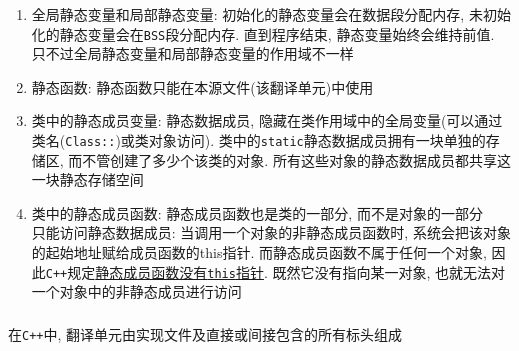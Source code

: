 \documentclass[10pt,twoside]{ctexart}
\begin{document}
\subsubsection[ISOK:{\tt static}关键字]{}
\begin{enumerate}
	\item 全局静态变量和局部静态变量: 初始化的静态变量会在数据段分配内存, 未初始化的静态变量会在{\tt BSS}段分配内存. 
			直到程序结束, 静态变量始终会维持前值. 只不过全局静态变量和局部静态变量的作用域不一样
	\item 静态函数: 静态函数只能在本源文件(该翻译单元)中使用
	\item 类中的静态成员变量: 静态数据成员, 隐藏在类作用域中的全局变量(可以通过类名({\tt Class::})或类对象访问). 
			类中的{\tt static}静态数据成员拥有一块单独的存储区, 而不管创建了多少个该类的对象. 
			所有这些对象的静态数据成员都共享这一块静态存储空间
	\item 类中的静态成员函数: 静态成员函数也是类的一部分, 而不是对象的一部分
		\\  只能访问静态数据成员: 
			当调用一个对象的非静态成员函数时, 系统会把该对象的起始地址赋给成员函数的this指针. 
			而静态成员函数不属于任何一个对象, 因此{\tt C++}规定\uline{静态成员函数没有{\tt this}指针}. 
			既然它没有指向某一对象, 也就无法对一个对象中的非静态成员进行访问
\end{enumerate}

\subsubsection[ISOK:{\tt extern}关键字与链接性]{}

在{\tt C++}中, 翻译单元由实现文件及直接或间接包含的所有标头组成
\end{document}
